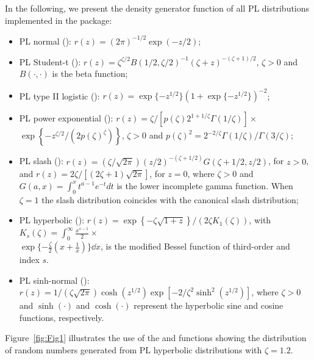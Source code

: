 In the following, we present the density generator function of all PL distributions implemented in the  package:
\begin{itemize}
\item PL normal (): $r(z) = (2\pi)^{-1/2}\exp(-z/2)$;
\item PL Student-t (): $r(z) = \zeta^{\zeta/2}B(1/2,\zeta/2)^{-1}(\zeta + z)^{-(\zeta+1)/2}$, $\zeta>0$ and $B(\cdot,\cdot)$ is the beta function;
\item PL type II logistic (): $r(z) = \exp\{ - z^{1/2} \}(1 + \exp\{ - z^{1/2} \})^{-2}$;
\item PL power exponential (): $r(z) = \zeta/[p(\zeta) 2^{1 + 1/\zeta} \Gamma(1/\zeta)] \times$
\\$ \exp\left\{-z^{\zeta/2}/(2 p(\zeta)^\zeta) \right\}$, $\zeta>0$ and $p(\zeta)^2 = 2^{-2/\zeta} \Gamma(1/\zeta)/\Gamma(3/\zeta)$;
\item PL slash (): $r(z) = (\zeta/\sqrt{2\pi}) \left( z/2 \right)^{-(\zeta + 1/2  )} G\left( \zeta + 1/2, z/2 \right)$, for $z>0$, and $r(z) = 2\zeta/[(2\zeta+1)\sqrt{2\pi}]$, for $z=0$, where $\zeta>0$ and $G(a,x) = \int_0^x t^{a-1}e^{-t}dt$ is the lower incomplete gamma function. When $\zeta = 1$ the slash distribution coincides with the canonical slash distribution;
\item PL hyperbolic (): $r(z) = \exp\left\{ - \zeta \sqrt{1+z} \right\}/(2 \zeta K_1(\zeta))$, with $K_s(\zeta) = \int_0^\infty \frac{x^{s-1}}{2}\times$
\\$ \exp\{ -\frac{\zeta}{2} \left(x + \frac{1}{x} \right) \} \dd x$, is the modified Bessel function of third-order and index $s$.
\item PL sinh-normal (): $r(z) = 1/(\zeta \sqrt{2 \pi}) \cosh(z^{1/2}) \exp\left[ - 2/\zeta^2 \sinh^2 (z^{1/2}) \right]$, where $\zeta>0$ and $\sinh(\cdot)$ and $\cosh(\cdot)$ represent the hyperbolic sine and cosine functions, respectively.
\end{itemize}

Figure~\ref{fig:Fig1} illustrates the use of the  and  functions showing the distribution of random numbers generated from PL hyperbolic distributions with $\zeta=1.2$.


